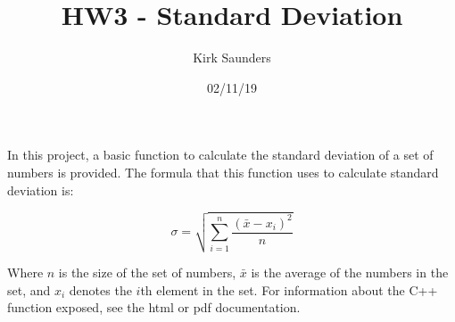 \documentclass[12pt]{article}
\title{HW3 - Standard Deviation}
\author{Kirk Saunders}
\date{02/11/19}
\begin{document}
\maketitle

In this project, a basic function to calculate the standard deviation of a set of numbers is provided. The formula that this function uses to calculate standard deviation is:

$$\sigma = \sqrt{\sum\limits_{i=1}^n \frac{(\bar{x}-x_i)^2}{n}}$$

Where $n$ is the size of the set of numbers, $\bar{x}$ is the average of the numbers in the set, and $x_i$ denotes the $i$th element in the set. For information about the C++ function exposed, see the html or pdf documentation.
\end{document}
